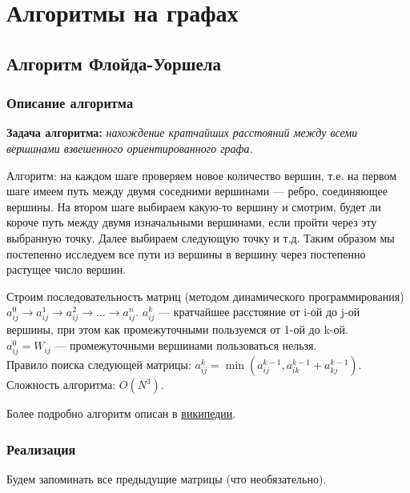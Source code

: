 \chapter{Алгоритмы на графах}
\section{Алгоритм Флойда-Уоршела}
\subsection{Описание алгоритма}
\textbf{Задача алгоритма:} \emph{нахождение кратчайших расстояний между всеми вершинами взвешенного ориентированного графа.}

Алгоритм: на каждом шаге проверяем новое количество вершин, т.е. на первом шаге имеем путь между двумя соседними вершинами --- ребро, соединяющее вершины. На втором шаге выбираем какую-то вершину и смотрим, будет ли короче путь между двумя изначальными вершинами, если пройти через эту выбранную точку. Далее выбираем следующую точку и т.д. Таким образом мы постепенно исследуем все пути из вершины в вершину через постепенно растущее число вершин. 

Строим последовательность матриц (методом динамического программирования) $a_{ij}^0 \rightarrow a^1_{ij} \rightarrow a^2_{ij} \rightarrow\dots\rightarrow a^n_{ij}$. $a^k_{ij}$ --- кратчайшее расстояние от i-ой до j-ой вершины, при этом как промежуточными пользуемся от 1-ой до k-ой.\\
$a_{ij}^0 = W_{ij}$ --- промежуточными вершинами пользоваться нельзя.\\
Правило поиска следующей матрицы: $a_{ij}^k= \min(a^{k-1}_{ij}, a^{k-1}_{ik}+a^{k-1}_{kj}).$\\
Сложность алгоритма: $O(N^3)$.

Более подробно алгоритм описан в \href{https://ru.wikipedia.org/wiki/%D0%90%D0%BB%D0%B3%D0%BE%D1%80%D0%B8%D1%82%D0%BC_%D0%A4%D0%BB%D0%BE%D0%B9%D0%B4%D0%B0_%E2%80%94_%D0%A3%D0%BE%D1%80%D1%88%D0%B5%D0%BB%D0%BB%D0%B0}{википедии}.
\subsection{Реализация}
Будем запоминать все предыдущие матрицы (что необязательно).

